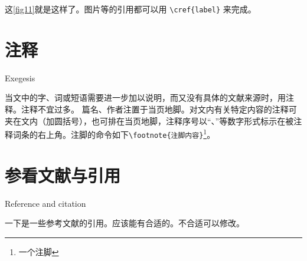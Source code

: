 这\cref{fig11}就是这样了。图片等的引用都可以用 \verb|\cref{label}| 来完成。


\section{注释}{Exegesis}

当文中的字、词或短语需要进一步加以说明，而又没有具体的文献来源时，用注释。注释不宜过多。
篇名、作者注置于当页地脚。对文内有关特定内容的注释可夹在文内（加圆括号），也可排在当页地脚，注释序号以“、”等数字形式标示在被注释词条的右上角。注脚的命令如下\verb|\footnote{注脚内容}|\footnote{一个注脚}。%

\section{参看文献与引用}{Reference and citation}

一下是一些参考文献的引用。应该能有合适的。不合适可以修改。


\cite{liuhaiyang2013latex,CTEX}

\cite{XMU}

\citet{liuhaiyang2013latex}

\citep{liuhaiyang2013latex}

\citealt{liuhaiyang2013latex}

\citeauthor{liuhaiyang2013latex}

\citeyearpar{liuhaiyang2013latex}

